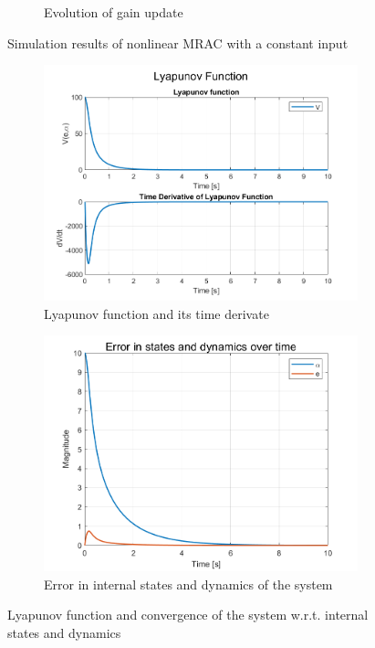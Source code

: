 \begin{figure}[!t]
\begin{subfigure}[b]{0.49\linewidth}
        \caption{Evolution of gain update}
        \label{fig:step-weights}
    \end{subfigure}
       \caption{Simulation results of nonlinear MRAC with a constant input}
       \label{fig:nl-step}
\end{figure}


\begin{figure}[!t]
    \centering
    \begin{subfigure}[b]{0.49\linewidth}
        \centering
        \includegraphics[width=\linewidth]{images/NL-MRAC-SIM/Step/v2/NMRAC_First-Order_Lyapunov.png}
        \caption{Lyapunov function and its time derivate}
        \label{fig:Lyapunov-step-input}
    \end{subfigure}
    \hfill
    \begin{subfigure}[b]{0.49\linewidth}
        \centering
        \includegraphics[width=\linewidth]{images/NL-MRAC-SIM/Step/v2/NMRAC_First-Order_Alpha.png}
        \caption{Error in internal states and dynamics of the system}
        \label{fig:step-error}
    \end{subfigure}
       \caption{Lyapunov function and convergence of the system w.r.t. internal states and dynamics}
       \label{fig:step-lyap}
\end{figure}

